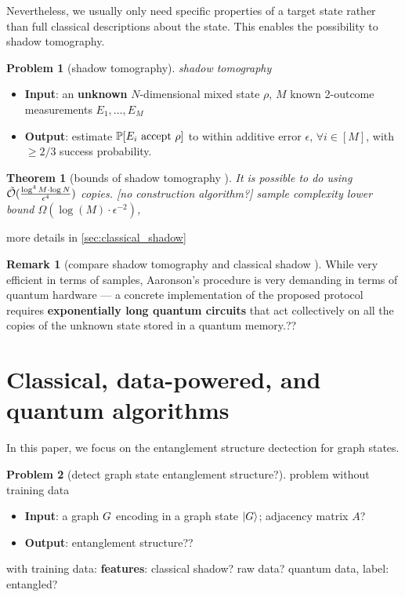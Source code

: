 \documentclass[
10pt,
aps,
pra,
linenumbers,
floatfix,
]{revtex4-2}
\theoremstyle{plain}
\newtheorem{theorem}{Theorem}
\theoremstyle{definition}
\newtheorem{remark}{Remark}
\newtheorem{problem}{Problem}
\newcommand{\dm}{\rho}
\begin{document}
Nevertheless, we usually only need specific properties of a target state rather than full classical descriptions about the state.
This enables the possibility to shadow tomography.
\begin{problem}[shadow tomography]\label{prm:shadow_tomography}
	\emph{shadow tomography}
	\begin{itemize}
		\item \textbf{Input}: an \textbf{unknown} $N$-dimensional mixed state $\rho$, $M$ known 2-outcome measurements $E_1,\dots,E_M$
		\item \textbf{Output}: estimate $\probability[E_i \text{ accept } \dm]$ to within additive error $\epsilon$, $\forall i\in [M]$, with $\ge 2/3$ success probability.	
	\end{itemize}
\end{problem}
\begin{theorem}[bounds of shadow tomography \cite{aaronsonShadowTomographyQuantum2018}]\label{thm:shadow_tomography}
	It is possible to do  using $\tilde{\mathcal{O}}(\frac{\log^4 M\cdot \log N}{\epsilon^4})$ copies. [no construction algorithm?]
	sample complexity lower bound $\Omega(\log (M) \cdot \epsilon^{-2})$, 
\end{theorem}
more details in \cref{sec:classical_shadow}
\begin{remark}[compare shadow tomography and classical shadow \cite{huangPredictingManyProperties2020}]
	While very efficient in terms of samples, Aaronson's procedure is very demanding in terms of quantum hardware — a concrete implementation of the proposed protocol requires \textbf{exponentially long quantum circuits} that act collectively on all the copies of the unknown state stored in a quantum memory.??
\end{remark}

\section{Classical, data-powered, and quantum algorithms}
In this paper, we focus on the entanglement structure dectection for graph states.
\begin{problem}[detect graph state entanglement structure?]
	problem without training data
	\begin{itemize}
		\item \textbf{Input}: a graph $G$ encoding in a graph state $\ket{G}$;
		adjacency matrix $A$?
		\item \textbf{Output}: entanglement structure??
	\end{itemize}
\end{problem}
with training data: 
\textbf{features}: classical shadow? raw data? quantum data, label: entangled?
\end{document}
